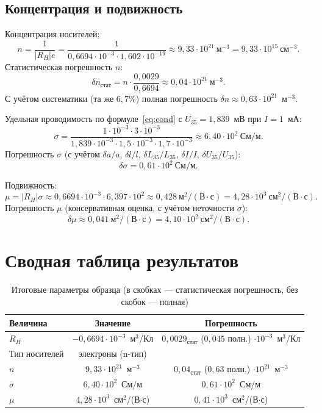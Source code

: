 \documentclass[a4paper,12pt]{article}
\begin{document}
\subsection{Концентрация и подвижность}
Концентрация носителей:
\[
    n = \frac{1}{|R_H| e} = \frac{1}{0{,}6694\cdot 10^{-3} \cdot 1{,}602\cdot 10^{-19}} \approx 9{,}33\cdot 10^{21}~\text{м}^{-3} = 9{,}33\cdot 10^{15}~\text{см}^{-3}.
\]
Статистическая погрешность \(n\):
\[
    \delta n_{\text{стат}} = n\cdot\frac{0{,}0029}{0{,}6694} \approx 0{,}04\cdot 10^{21}~\text{м}^{-3}.
\]
С учётом систематики (та же \(6{,}7\%\)) полная погрешность \(\delta n \approx 0{,}63\cdot 10^{21}\)~м$^{-3}$.

Удельная проводимость по формуле~\eqref{eq:cond} с \(U_{35} = 1{,}839\)~мВ при \(I = 1\)~мА:
\[
    \sigma = \frac{1\cdot10^{-3}\cdot 3\cdot10^{-3}}{1{,}839\cdot10^{-3} \cdot 1{,}5\cdot10^{-3} \cdot 1{,}7\cdot10^{-3}} \approx 6{,}40\cdot10^{2}~\text{См/м}.
\]
Погрешность \(\sigma\) (с учётом \(\delta a/a\), \(\delta l/l\), \(\delta L_{35}/L_{35}\), \(\delta I/I\), \(\delta U_{35}/U_{35}\)):
\[
    \delta\sigma = 0{,}61\cdot 10^{2}~\text{См/м}.
\]

Подвижность:
\[
    \mu = |R_H| \sigma \approx 0{,}6694\cdot10^{-3} \cdot 6{,}397\cdot10^{2} \approx 0{,}428~\text{м}^2/(\text{В}\cdot\text{с}) = 4{,}28\cdot 10^{3}~\text{см}^2/(\text{В}\cdot\text{с}).
\]
Погрешность \(\mu\) (консервативная оценка, с учётом неточности \(\sigma\)):
\[
    \delta\mu \approx 0{,}041~\text{м}^2/(\text{В}\cdot\text{с}) = 4{,}10\cdot 10^{2}~\text{см}^2/(\text{В}\cdot\text{с}).
\]

\section{Сводная таблица результатов}
\begin{table}[H]
    \centering
    \caption{Итоговые параметры образца (в скобках --- статистическая погрешность, без скобок --- полная)}
    \begin{tabular}{lcc}
        \toprule
        Величина & Значение & Погрешность \\
        \midrule
        \(R_H\) & \(-0{,}6694\cdot 10^{-3}\)~м$^3$/Кл & \(0{,}0029_{\text{стат}}\) ($0{,}045$ полн.) $\cdot 10^{-3}$~м$^3$/Кл \\
        Тип носителей & электроны (n-тип) & \\
        \(n\) & \(9{,}33\cdot 10^{21}\)~м$^{-3}$ & \(0{,}04_{\text{стат}}\) ($0{,}63$ полн.) $\cdot 10^{21}$~м$^{-3}$ \\
        \(\sigma\) & \(6{,}40\cdot 10^{2}\)~См/м & \(0{,}61\cdot 10^{2}\)~См/м \\
        \(\mu\) & \(4{,}28\cdot 10^{3}\)~см$^2$/(В$\cdot$с) & \(0{,}41\cdot 10^{3}\)~см$^2$/(В$\cdot$с) \\
        \bottomrule
    \end{tabular}
\end{table}
\end{document}
